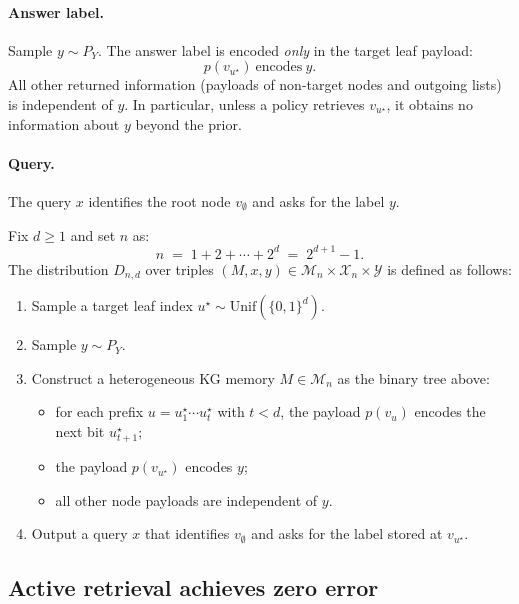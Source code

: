 \documentclass{llmxive}
\begin{document}
\paragraph{Answer label.}
Sample \(y \sim P_Y\). The answer label is encoded \emph{only} in the target leaf payload:
\[
p(v_{u^\star})\ \text{encodes}\ y.
\]
All other returned information (payloads of non-target nodes and outgoing lists) is independent of \(y\). In particular,
unless a policy retrieves \(v_{u^\star}\), it obtains no information about \(y\) beyond the prior.

\paragraph{Query.}
The query \(x\) identifies the root node \(v_\emptyset\) and asks for the label $y$.

\begin{definition}
Fix \(d\ge 1\) and set \(n\) as:
\[
n \;=\; 1 + 2 + \cdots + 2^d \;=\; 2^{d+1}-1.
\]
The distribution \(D_{n,d}\) over triples \((M,x,y)\in \mathcal{M}_n\times \mathcal{X}_n\times \mathcal{Y}\) is defined
as follows:
\begin{enumerate}
\item Sample a target leaf index \(u^\star \sim \mathrm{Unif}(\{0,1\}^d)\).
\item Sample \(y \sim P_Y\).
\item Construct a heterogeneous KG memory \(M\in \mathcal{M}_n\) as the binary tree above:
\begin{itemize}
\item for each prefix \(u = u^\star_1\cdots u^\star_t\) with \(t<d\), the payload \(p(v_u)\) encodes the next bit
\(u^\star_{t+1}\);
\item the payload \(p(v_{u^\star})\) encodes \(y\);
\item all other node payloads are independent of
\(y\).
\end{itemize}
\item Output a query \(x\) that identifies \(v_\emptyset\) and asks for the label stored at \(v_{u^\star}\).
\end{enumerate}
\end{definition}



\subsection{Active retrieval achieves zero error}
\end{document}
